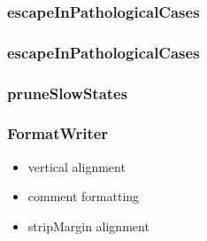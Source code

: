 \subsubsection{escapeInPathologicalCases}
\subsubsection{escapeInPathologicalCases}
\subsubsection{pruneSlowStates}
\subsubsection{FormatWriter}
\begin{itemize}
  \item vertical alignment
  \item comment formatting
  \item stripMargin alignment
\end{itemize}
